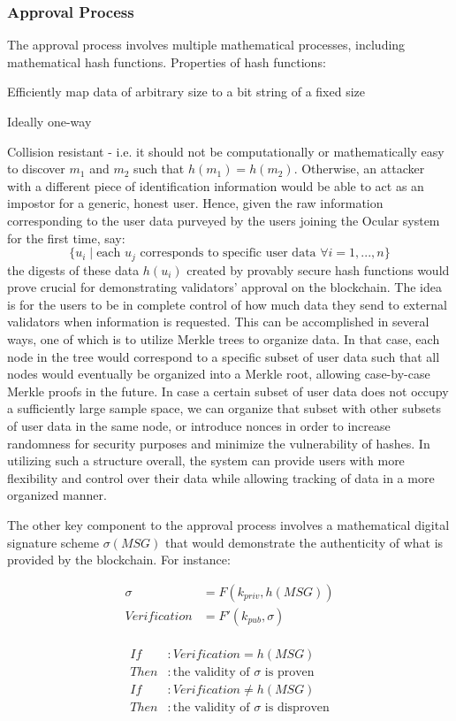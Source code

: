 \documentclass[a4paper]{article}
\let\tempone\itemize
\let\temptwo\enditemize
\renewenvironment{itemize}{\tempone\addtolength{\itemsep}{-5pt}}{\temptwo}
\begin{document}
\subsubsection*{Approval Process}
The approval process involves multiple mathematical processes, including mathematical hash functions. Properties of hash functions:

\begin{itemize}
\item Efficiently map data of arbitrary size to a bit string of a fixed size
\item Ideally one-way
\item Collision resistant - i.e. it should not be computationally or mathematically easy to discover $m_1$ and $m_2$ such that $h(m_1)=h(m_2)$. Otherwise, an attacker with a different piece of identification information would be able to act as an impostor for a generic, honest user.
\end{itemize} Hence, given the raw information corresponding to the user data purveyed by the users joining the Ocular system for the first time, say: $$\{u_i\mid\text{each }u_j\text{ corresponds to specific user data }\forall i=1,...,n\}$$ the digests of these data $h(u_i)$ created by provably secure hash functions would prove crucial for demonstrating validators' approval on the blockchain.
The idea is for the users to be in complete control of how much data they send to external validators when information is requested. This can be accomplished in several ways, one of which is to utilize Merkle trees to organize data. In that case, each node in the tree would correspond to a specific subset of user data such that all nodes would eventually be organized into a Merkle root, allowing case-by-case Merkle proofs in the future. In case a certain subset of user data does not occupy a sufficiently large sample space, we can organize that subset with other subsets of user data in the same node, or introduce nonces in order to increase randomness for security purposes and minimize the vulnerability of hashes. In utilizing such a structure overall, the system can provide users with more flexibility and control over their data while allowing tracking of data in a more organized manner.

The other key component to the approval process involves a mathematical digital signature scheme $\sigma(MSG)$ that would demonstrate the authenticity of what is provided by the blockchain. For instance:

\begin{align*}
\sigma &= F(k_{priv}, h(MSG))\\
Verification &= F'(k_{pub}, \sigma)
\end{align*}\\
\begin{align*}
If&: Verification=h(MSG)\\
Then&: \text{the validity of $\sigma$ is proven}\\
If&: Verification\neq h(MSG)\\
Then&: \text{the validity of $\sigma$ is disproven}
\end{align*}
\end{document}
